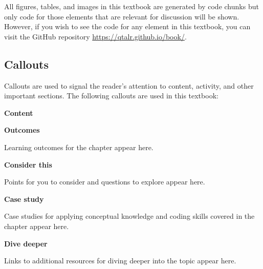 \documentclass[
  letterpaper,
]{latex/krantz}
\begin{document}
All figures, tables, and images in this textbook are generated by code
chunks but only code for those elements that are relevant for discussion
will be shown. However, if you wish to see the code for any element in
this textbook, you can visit the GitHub repository
\url{https://qtalr.github.io/book/}.

\hypertarget{callouts}{%
\subsection*{Callouts}\label{callouts}}

Callouts are used to signal the reader's attention to content, activity,
and other important sections. The following callouts are used in this
textbook:

\textbf{Content}

\begin{tcolorbox}[enhanced jigsaw, arc=.35mm, leftrule=.75mm, rightrule=.15mm, opacityback=0, colback=white, breakable, bottomrule=.15mm, left=2mm, toprule=.15mm]

\textbf{ Outcomes}

Learning outcomes for the chapter appear here.

\end{tcolorbox}

\begin{tcolorbox}[enhanced jigsaw, arc=.35mm, leftrule=.75mm, rightrule=.15mm, opacityback=0, colback=white, breakable, bottomrule=.15mm, left=2mm, toprule=.15mm]

\textbf{ Consider this}

Points for you to consider and questions to explore appear here.

\end{tcolorbox}

\begin{tcolorbox}[enhanced jigsaw, arc=.35mm, leftrule=.75mm, rightrule=.15mm, opacityback=0, colback=white, breakable, bottomrule=.15mm, left=2mm, toprule=.15mm]

\textbf{ Case study}

Case studies for applying conceptual knowledge and coding skills covered
in the chapter appear here.

\end{tcolorbox}

\begin{tcolorbox}[enhanced jigsaw, arc=.35mm, leftrule=.75mm, rightrule=.15mm, opacityback=0, colback=white, breakable, bottomrule=.15mm, left=2mm, toprule=.15mm]

\textbf{ Dive deeper}

Links to additional resources for diving deeper into the topic appear
here.

\end{tcolorbox}
\end{document}
